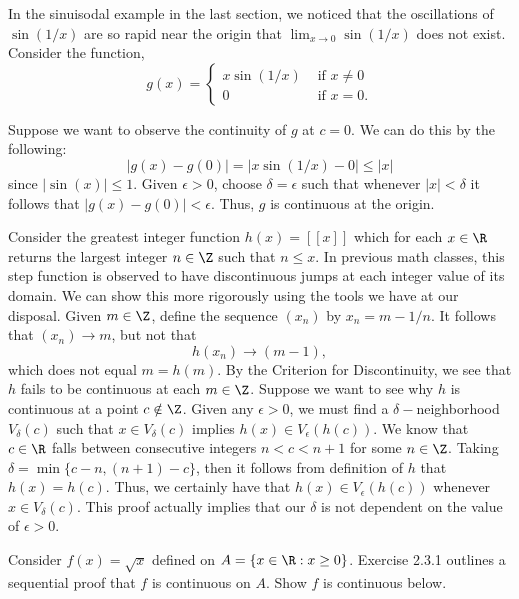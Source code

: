 \begin{ex}
In the sinuisodal example in the last section, we noticed that the oscillations of \( \sin (1/x ) \) are so rapid near the origin that \( \lim_{ x \to 0  } \sin (1/x) \) does not exist. Consider the function, 
\[  g(x) = 
\begin{cases}
    x \sin (1/x) &\text{~if~} x \neq 0 \\ 
    0 &\text{~if~}  x = 0. 
\end{cases} \]
\end{ex}
Suppose we want to observe the continuity of \( g \) at \( c = 0  \). We can do this by the following:
\[ | g(x) - g(0) | = | x \sin(1/x) - 0  | \leq | x |   \]
since \( | \sin (x)  |  \leq 1 \). Given \( \epsilon > 0 \), choose \( \delta = \epsilon  \) such that whenever \( | x | < \delta \) it follows that \( | g(x) - g(0) | < \epsilon  \). Thus, \( g  \) is continuous at the origin. 


\begin{ex}
    Consider the greatest integer function \( h(x) = [[x]] \) which for each \( x \in \R  \) returns the largest integer \( n \in \Z  \) such that \( n \leq x  \). In previous math classes, this step function is observed to have discontinuous jumps at each integer value of its domain. We can show this more rigorously using the tools we have at our disposal. Given \( m \in \Z  \), define the sequence \( (x_n)  \) by \( x_n = m -  1/n \). It follows that \( (x_n) \to m \), but not that 
    \[  h(x_n) \to (m-1), \]
    which does not equal \( m = h(m) \). By the Criterion for Discontinuity, we see that \( h \) fails to be continuous at each \( m \in \Z  \). Suppose we want to see why \( h  \) is continuous at a point \( c \notin \Z \). Given any \( \epsilon > 0  \), we must find a \( \delta-\)neighborhood \( V_{\delta}(c) \) such that \( x \in V_{\delta}(c) \) implies \( h(x) \in V_{\epsilon }(h(c)) \). We know that \( c \in \R  \) falls between consecutive integers \( n < c < n+1 \) for some \(  n \in \Z  \). Taking \( \delta = \min \{ c -n , (n+1) - c  \}  \), then it follows from definition of \( h \) that \( h(x) = h(c) \). Thus, we certainly have that \( h(x) \in V_{\epsilon }(h(c)) \) whenever \( x \in V_{\delta}(c) \). This proof actually implies that our \( \delta \) is not dependent on the value of \( \epsilon > 0  \). 
\end{ex}

\begin{ex}
Consider \( f(x) = \sqrt{ x }  \) defined on \( A = \{ x \in \R : x \geq 0 \}  \). Exercise 2.3.1 outlines a sequential proof that \( f  \) is continuous on \( A  \). Show \( f \) is continuous below.
\end{ex}

